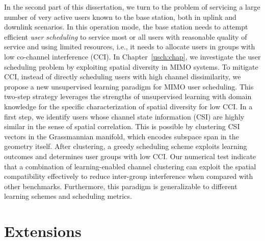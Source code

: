 In the second part of this dissertation, we turn to the problem of servicing a large number of very active users known to the base station, both in uplink and downlink scenarios. In this operation mode, the base station needs to attempt efficient \emph{user scheduling} to service most or all users with reasonable quality of service and using limited resources, i.e., it needs to allocate users in groups with low co-channel interference (CCI).
In Chapter~\ref{usch:chap}, we investigate the user scheduling problem by exploiting spatial diversity in MIMO systems. To mitigate CCI, instead of directly scheduling users with high channel dissimilarity, we propose a new unsupervised learning paradigm for MIMO user scheduling. This two-step strategy leverages the strengths of unsupervised learning with domain knowledge for the specific characterization of spatial diversity for low CCI. In a first step, we identify users whose channel state information (CSI) are highly similar in the sense of spatial correlation. This is possible by clustering CSI vectors in the Grassmannian manifold, which encodes subspace span in the geometry itself. After clustering, a greedy scheduling scheme exploits learning outcomes and determines user groups with low CCI. Our numerical test indicate that a combination of  learning-enabled channel clustering can exploit the spatial compatibility effectively to reduce inter-group interference when compared with other benchmarks. Furthermore, this paradigm is generalizable to different learning schemes and scheduling metrics.

\section{Extensions}


